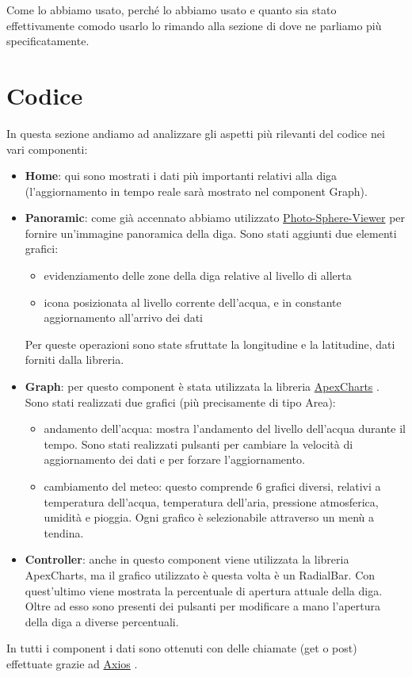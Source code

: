 \documentclass[a4paper,12pt]{report}
\newcommand{\apexcharts}{\href{https://apexcharts.com/}{ApexCharts} }
\newcommand{\axios}{\href{https://axios-http.com/}{Axios} }
\newcommand{\photosphereviewer}{\href{https://photo-sphere-viewer.js.org/}{Photo-Sphere-Viewer} }
\begin{document}
Come lo abbiamo usato, perché lo abbiamo usato e quanto sia stato effettivamente comodo usarlo lo rimando alla sezione di  dove ne parliamo più specificatamente.

\clearpage
\chapter{Codice}\label{sec:code}
In questa sezione andiamo ad analizzare gli aspetti più rilevanti del codice nei vari componenti:
\begin{itemize}
    \item \textbf{Home}: qui sono mostrati i dati più importanti relativi alla diga (l'aggiornamento in tempo reale sarà mostrato nel component Graph).
	\item \textbf{Panoramic}: come già accennato abbiamo utilizzato \photosphereviewer per fornire un'immagine panoramica della diga. Sono stati aggiunti due elementi grafici:
    	\begin{itemize}
    	    \item evidenziamento delle zone della diga relative al livello di allerta
    	    \item icona posizionata al livello corrente dell'acqua, e in constante aggiornamento all'arrivo dei dati
    	\end{itemize}
	Per queste operazioni sono state sfruttate la longitudine e la latitudine, dati forniti dalla libreria.
	\item \textbf{Graph}: per questo component è stata utilizzata la libreria \apexcharts. Sono stati realizzati due grafici (più precisamente di tipo Area):
	\begin{itemize}
	    \item andamento dell'acqua: mostra l'andamento del livello dell'acqua durante il tempo. Sono stati realizzati pulsanti per cambiare la velocità di aggiornamento dei dati e per forzare l'aggiornamento.
	    \item cambiamento del meteo:  questo comprende 6 grafici diversi, relativi a temperatura dell'acqua, temperatura dell'aria, pressione atmosferica, umidità e pioggia. Ogni grafico è selezionabile attraverso un menù a tendina.
	\end{itemize}
	\item \textbf{Controller}: anche in questo component viene utilizzata la libreria ApexCharts, ma il grafico utilizzato è questa volta è un RadialBar. Con quest'ultimo viene mostrata la percentuale di apertura attuale della diga. Oltre ad esso sono presenti dei pulsanti per modificare a mano l'apertura della diga a diverse percentuali.
\end{itemize}
In tutti i component i dati sono ottenuti con delle chiamate (get o post) effettuate grazie ad \axios.
\end{document}
